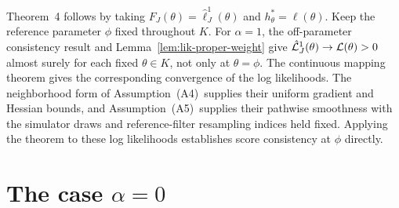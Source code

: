 \documentclass[11pt]{article}
\newcommand\thmMopGradConsistency{4}
\newcommand\refAssumpLocalBoundedDerivative{(A4)} %
\newcommand\refAssumpDifferentiableSimulator{(A5)} %
\theoremstyle{thmstylethree}%
\begin{document}
Theorem~{\thmMopGradConsistency} follows by taking $F_J(\theta)=\hat\ell_J^1(\theta)$ and $h_\theta^*=\ell(\theta)$. Keep the reference parameter $\phi$ fixed throughout $K$. For $\alpha=1$, the off-parameter consistency result and Lemma~\ref{lem:lik-proper-weight} give $\hat{\mathcal{L}}_J^1(\theta)\to\mathcal{L}(\theta)>0$ almost surely for each fixed $\theta\in K$, not only at $\theta=\phi$. The continuous mapping theorem gives the corresponding convergence of the log likelihoods. The neighborhood form of Assumption~\refAssumpLocalBoundedDerivative\ supplies their uniform gradient and Hessian bounds, and Assumption~\refAssumpDifferentiableSimulator\ supplies their pathwise smoothness with the simulator draws and reference-filter resampling indices held fixed. Applying the theorem to these log likelihoods establishes score consistency at $\phi$ directly.


\section{The case $\alpha=0$}
\label{appendix:biasvar}
\end{document}

